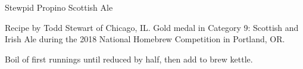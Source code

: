 \begin{recipe}{Stewpid Propino Scottish Ale}

\begin{aboutblock}
Recipe by Todd Stewart of Chicago, IL. Gold medal in Category 9: Scottish and Irish
Ale during the 2018 National Homebrew Competition in Portland, OR.
\sourceaha
\end{aboutblock}


\begin{methodandtiming}

\begin{mashsteps}
\end{mashsteps}

\begin{fermentationsteps}
\end{fermentationsteps}

\begin{directions}
Boil  of first runnings until reduced by half, then add to brew
kettle.
\end{directions}

\end{methodandtiming}

\recipebreak

\begin{ingredientsblock}

\begin{malts}
\end{malts}

\begin{hops}
\end{hops}


\end{ingredientsblock}

\end{recipe}
